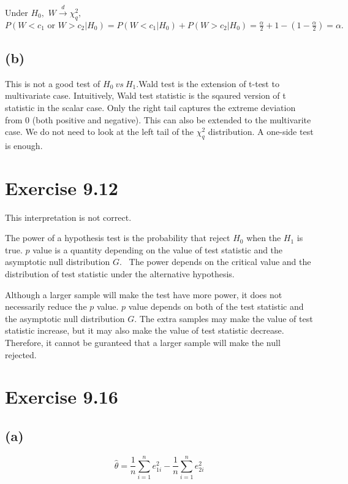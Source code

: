 \documentclass{article}
\begin{document}
Under $H_{0},$ $W\overset{d}{\rightarrow }\chi _{q}^{2},$ $P\left( \left.
W<c_{1}\text{ or }W>c_{2}\right\vert H_{0}\right) =P\left( \left.
W<c_{1}\right\vert H_{0}\right) +P\left( \left. W>c_{2}\right\vert
H_{0}\right) =\frac{\alpha }{2}+1-(1-\frac{\alpha }{2})=\alpha .$

\subsection*{(b)}

This is not a good test of $H_{0}~vs~H_{1}.$Wald test is the extension of
t-test to multivariate case. Intuitively, Wald test statistic is the sqaured
version of t statistic in the scalar case. Only the right tail captures the
extreme deviation from $0$ (both positive and negative). This can also be
extended to the multivarite case. We do not need to look at the left tail of
the $\chi _{q}^{2}$ distribution. A one-side test is enough. 

\section*{Exercise 9.12}

This interpretation is not correct.

The power of a hypothesis test is the probability that reject $H_{0}$ when
the $H_{1}$ is true. $p$ value is a quantity depending on the value of test
statistic and the asymptotic null distribution $G.$ \ The power depends on
the critical value and the distribution of test statistic under the
alternative hypothesis.

Although a larger sample will make the test have more power, it does not
necessarily reduce the $p$ value. $p$ value depends on both of the test
statistic and the asymptotic null distribution $G.$ The extra samples may
make the value of test statistic increase, but it may also make the value of
test statistic decrease. Therefore, it cannot be guranteed that a larger
sample will make the null rejected.

\section*{Exercise 9.16}

\subsection*{(a)}

\begin{equation*}
\hat{\theta}=\frac{1}{n}\sum_{i=1}^{n}e_{1i}^{2}-\frac{1}{n}%
\sum_{i=1}^{n}e_{2i}^{2}
\end{equation*}
\end{document}
